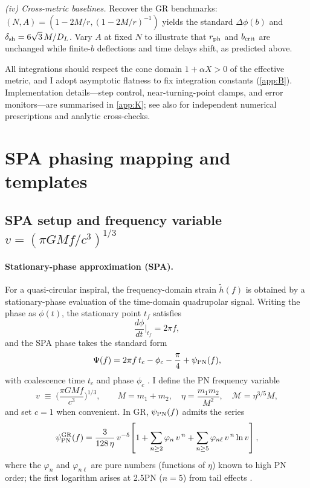 \documentclass{iopjournal}
\begin{document}
\emph{(iv) Cross-metric baselines.} Recover the GR benchmarks: $(N,A)=(1-2M/r,(1-2M/r)^{-1})$ yields the standard $\Delta\phi(b)$ and $\delta_{\rm sh}=6\sqrt{3}\,M/D_L$. Vary $A$ at fixed $N$ to illustrate that $r_{\rm ph}$ and $b_{\rm crit}$ are unchanged while finite-$b$ deflections and time delays shift, as predicted above.

All integrations should respect the cone domain $1+\alpha X>0$ of the effective metric, and I adopt asymptotic flatness to fix integration constants (\cref{app:B}). Implementation details—step control, near-turning-point clamps, and error monitors—are summarised in \cref{app:K}; see also \cite{Perlick2004LRR,Bozza2002PRD} for independent numerical prescriptions and analytic cross-checks.


\section{SPA phasing mapping and templates}\label{app:E}
\subsection{\texorpdfstring{SPA setup and frequency variable $v=(\pi GM f/c^3)^{1/3}$}{SPA setup and the frequency variable v}}\label{app:E1}
\paragraph{Stationary-phase approximation (SPA).}
For a quasi-circular inspiral, the frequency-domain strain $\tilde h(f)$ is obtained by a stationary-phase evaluation of the time-domain quadrupolar signal. Writing the phase as $\phi(t)$, the stationary point $t_f$ satisfies
\[
\frac{d\phi}{dt}\Big|_{t_f}=2\pi f,
\]
and the SPA phase takes the standard form
\begin{equation}
\Psi(f)=2\pi f\,t_c-\phi_c-\frac{\pi}{4}+\psi_{\rm PN}(f),
\label{eq:E1_SPAphase}
\end{equation}
with coalescence time $t_c$ and phase $\phi_c$ \cite{CutlerFlanagan1994,SathyaprakashSchutz2009,Blanchet2014LRR,MaggioreGW}. I define the PN frequency variable
\begin{equation}
v\;\equiv\;\Big(\frac{\pi GM f}{c^3}\Big)^{1/3},
\qquad
M=m_1+m_2,\quad
\eta=\frac{m_1 m_2}{M^2},\quad
\mathcal{M}=\eta^{3/5}M,
\label{eq:E1_v_def}
\end{equation}
and set $c=1$ when convenient. In GR, $\psi_{\rm PN}(f)$ admits the series
\begin{equation}
\psi_{\rm PN}^{\rm GR}(f)=\frac{3}{128\,\eta}\,v^{-5}\!
\left[
1+\sum_{n\ge2}\varphi_n\,v^{\,n}
+\sum_{n\ge5}\varphi_{n\ell}\,v^{\,n}\ln v
\right],
\label{eq:E1_GRseries}
\end{equation}
where the $\varphi_n$ and $\varphi_{n\ell}$ are pure numbers (functions of $\eta$) known to high PN order; the first logarithm arises at 2.5PN ($n=5$) from tail effects \cite{Blanchet2014LRR,MaggioreGW}.
\end{document}

